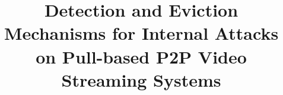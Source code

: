 


\title{Detection and Eviction Mechanisms for Internal Attacks on Pull-based P2P Video Streaming Systems}



\maketitle

 









% 
% 

\IEEEpeerreviewmaketitle



	